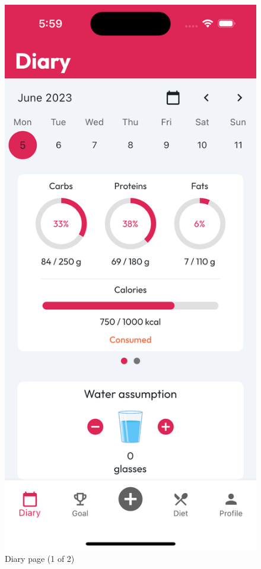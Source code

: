 \documentclass{Configuration_Files/PoliMi3i_thesis}
\begin{document}
\begin{figure}[!h]
    \includegraphics[scale=0.1]{Images/Screenshots/Mobile/Diary1Light.png}
    \caption{Diary page (1 of 2)}
\end{figure}
\end{document}
